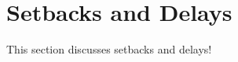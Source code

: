 \section{Setbacks and Delays\label{discussion:setbacks}}
This section discusses setbacks and delays!